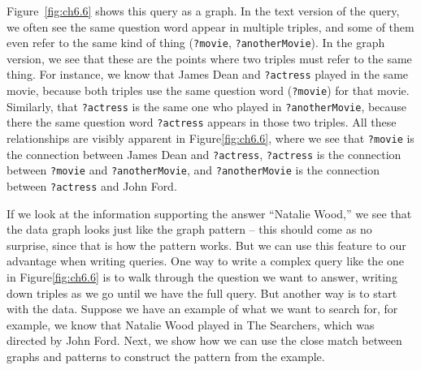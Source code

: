 Figure~\ref{fig:ch6.6} shows this query as a graph. In the text version of the
query, we often see the same question word appear in multiple triples,
and some of them even refer to the same kind of thing (\texttt{?movie},
\texttt{?anotherMovie}). In the graph version, we see that these are the points
where two triples must refer to the same thing. For instance, we know
that James Dean and \texttt{?actress} played in the same movie, because both
triples use the same question word (\texttt{?movie}) for that movie. Similarly,
that \texttt{?actress} is the same one who played in \texttt{?anotherMovie}, because there
the same question word \texttt{?actress} appears in those two triples. All these
relationships are visibly apparent in Figure\ref{fig:ch6.6}, where we see that
\texttt{?movie} is the connection between James Dean and \texttt{?actress}, \texttt{?actress} is
the connection between \texttt{?movie} and \texttt{?anotherMovie}, and \texttt{?anotherMovie} is
the connection between \texttt{?actress} and John Ford.

If we look at the information supporting the answer ``Natalie Wood,'' we
see that the data graph looks just like the graph pattern -- this should
come as no surprise, since that is how the pattern works. But we can use
this feature to our advantage when writing queries. One way to write a
complex query like the one in Figure\ref{fig:ch6.6} is to walk through the question
we want to answer, writing down triples as we go until we have the full query. But another way is to start with the
data. Suppose we have an example of what we want to search for, for
example, we know that Natalie Wood played in The Searchers, which was
directed by John Ford. Next, we show how we can use the close match
between graphs and patterns to construct the pattern from the example.


